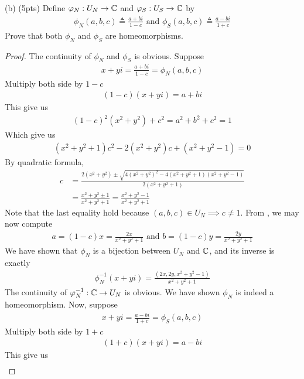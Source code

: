 \documentclass{report}
\begin{document}
\begin{question}{}{}
  (b) (5pts) Define $\varphi_N:U_N\rightarrow \mathbb{C}$ and $\varphi_S:U_S \rightarrow \mathbb{C}$ by 
  \begin{align*}
  \phi_N(a,b,c)\triangleq \frac{a+b i}{1-c}\text{ and }\phi_S (a,b,c)\triangleq \frac{a-b i}{1+c}
  \end{align*}
Prove that both $\phi_N$ and $\phi_S$ are homeomorphisms. 
\end{question}
\begin{proof}
The continuity of $\phi_N$ and $\phi_S$ is obvious. Suppose 
\begin{align*}
x+yi= \frac{a+b i}{1-c}= \phi_N (a,b,c)
\end{align*}
Multiply both side by $1-c$ 
 \begin{align}
\label{xyi}
   (1-c)(x+yi)=a+bi
\end{align}
This give us 
\begin{align*}
  (1-c)^2 (x^2+y^2) + c^2 = a^2+ b^2 + c^2 =1
\end{align*}
Which give us 
\begin{align*}
  (x^2+y^2+1)c^2 - 2(x^2+y^2) c + (x^2+y^2-1)=0
\end{align*}
By quadratic formula, 
\begin{align*}
c&= \frac{2(x^2+y^2)\pm \sqrt{4(x^2+y^2)^2 - 4(x^2+y^2+1)(x^2+y^2-1)} }{2(x^2+y^2+1)} \\
&=\frac{x^2+y^2 \pm 1}{x^2+y^2+1}= \frac{x^2+y^2-1}{x^2+y^2+1}
\end{align*}
Note that the last equality hold because $(a,b,c)\in U_N \implies c\neq 1$. From  , we may now compute 
\begin{align*}
a=(1-c)x= \frac{2x}{x^2+y^2+1}\text{ and }b=(1-c)y= \frac{2y}{x^2+y^2+1}
\end{align*}
We have shown that $\phi_N$ is a bijection between $U_N$ and $\mathbb{C}$, and its inverse is exactly 
 \begin{align}
\label{phn}
\phi_N^{-1} (x+yi)= \frac{(2x,2y,x^2+y^2-1)}{x^2+y^2+1} 
\end{align}
The continuity of $\varphi_N^{-1}:\mathbb{C} \rightarrow U_N$ is obvious. We have shown $\phi_N$ is indeed a homeomorphism. Now, suppose 
\begin{align}
\label{xyi2}
x+yi= \frac{a-b i}{1+c}= \phi_S(a,b,c)
\end{align}
Multiply both side by $1+c$ 
 \begin{align*}
   (1+c)(x+yi)=a-b i
\end{align*}
This give us 
\begin{align*}

\end{align*}
\end{proof}
\end{document}
